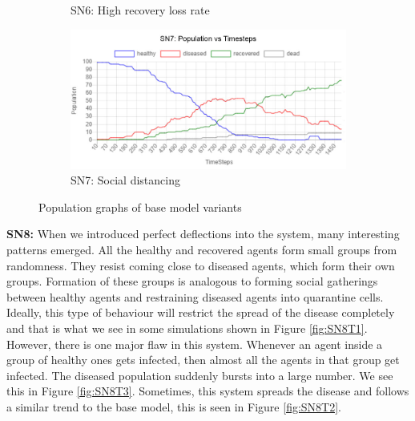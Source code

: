 \documentclass[a4paper,11pt]{article}
\begin{document}
\begin{figure}[H]
\begin{subfigure}[b]{0.49\linewidth}
            \caption{SN6: High recovery loss rate}
            \label{fig:SN6}
        \end{subfigure}
        \begin{subfigure}[b]{0.49\linewidth}
            \includegraphics[width=\linewidth]{pop_graphs/SN7_pop.jpg}
            \caption{SN7: Social distancing}
            \label{fig:SN7}
        \end{subfigure}
        \caption{Population graphs of base model variants}
    \end{figure}

    \textbf{SN8:} When we introduced perfect deflections into the system, many interesting patterns emerged.
    All the healthy and recovered agents form small groups from randomness.
    They resist coming close to diseased agents, which form their own groups.
    Formation of these groups is analogous to forming social gatherings between healthy agents and restraining diseased agents into quarantine cells.
    Ideally, this type of behaviour will restrict the spread of the disease completely and that is what we see in some simulations shown in Figure \ref{fig:SN8T1}.
    However, there is one major flaw in this system.
    Whenever an agent inside a group of healthy ones gets infected, then almost all the agents in that group get infected.
    The diseased population suddenly bursts into a large number.
    We see this in Figure \ref{fig:SN8T3}.
    Sometimes, this system spreads the disease and follows a similar trend to the base model, this is seen in Figure \ref{fig:SN8T2}.
\end{document}
